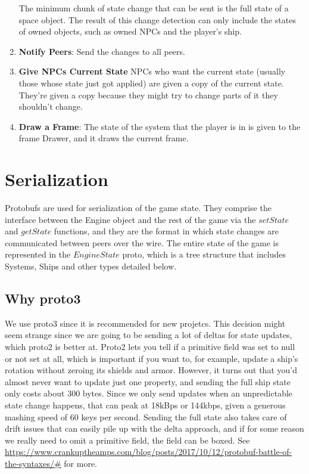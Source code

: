 \documentclass{article}
\begin{document}
\begin{enumerate}
  The minimum chunk of state change that can be sent is the full state of a space object. The result of this change detection can only include the states of owned objects, such as owned NPCs and the player's ship.

\item \textbf{Notify Peers}: Send the changes to all peers.

\item \textbf{Give NPCs Current State} NPCs who want the current state (usually those whose state just got applied) are given a copy of the current state. They're given a copy because they might try to change parts of it they shouldn't change.
\item \textbf{Draw a Frame}: The state of the system that the player is in is given to the frame Drawer, and it draws the current frame.
\end{enumerate}

\section{Serialization}
Protobufs are used for serialization of the game state. They comprise the interface between the Engine object and the rest of the game via the $setState$ and $getState$ functions, and they are the format in which state changes are communicated between peers over the wire. The entire state of the game is represented in the $EngineState$ proto, which is a tree structure that includes Systems, Ships and other types detailed below.

\subsection{Why proto3}
We use proto3 since it is recommended for new projetcs. This decision might seem strange since we are going to be sending a lot of deltas for state updates, which proto2 is better at. Proto2 lets you tell if a primitive field was set to null or not set at all, which is important if you want to, for example, update a ship's rotation without zeroing its shields and armor. However, it turns out that you'd almost never want to update just one property, and sending the full ship state only costs about 300 bytes. Since we only send updates when an unpredictable state change happens, that can peak at 18kBps or 144kbps, given a generous mashing speed of 60 keys per second. Sending the full state also takes care of drift issues that can easily pile up with the delta approach, and if for some reason we really need to omit a primitive field, the field can be boxed. See \url{https://www.crankuptheamps.com/blog/posts/2017/10/12/protobuf-battle-of-the-syntaxes/#} for more.
\end{document}
